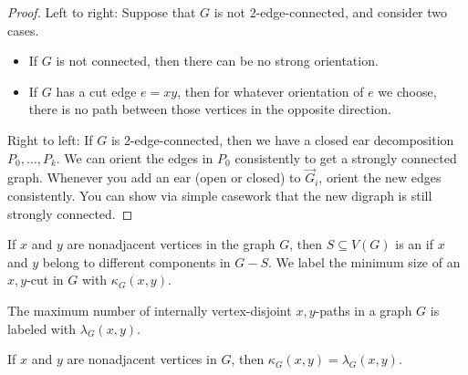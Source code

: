 \begin{proof}
  Left to right:
  Suppose that $G$ is not $2$-edge-connected, and consider two cases.
  \begin{itemize}
  \item If $G$ is not connected, then there can be no strong orientation.
  \item If $G$ has a cut edge $e = xy$, then for whatever orientation of $e$ we
	choose, there is no path between those vertices in the opposite direction.
  \end{itemize}

  Right to left:
  If $G$ is $2$-edge-connected, then we have a closed ear decomposition $P_0,
  \ldots, P_k$.
  We can orient the edges in $P_0$ consistently to get a strongly connected
  graph.
  Whenever you add an ear (open or closed) to $\vec{G}_i$, orient the new edges
  consistently.
  You can show via simple casework that the new digraph is still strongly
  connected.
\end{proof}



\begin{definition}
  If $x$ and $y$ are nonadjacent vertices in the graph $G$, then $S \subseteq
  V(G)$ is an  if $x$ and $y$ belong to different components in
  $G - S$.
  We label the minimum size of an $x,y$-cut in $G$ with $\kappa_G(x,y)$.
\end{definition}

\begin{definition}
  The maximum number of internally vertex-disjoint $x,y$-paths in a graph $G$ is
  labeled with $\lambda_G(x,y)$.
\end{definition}

\begin{theorem}
  If $x$ and $y$ are nonadjacent vertices in $G$, then $\kappa_G(x,y) =
  \lambda_G(x,y)$.
\end{theorem}

